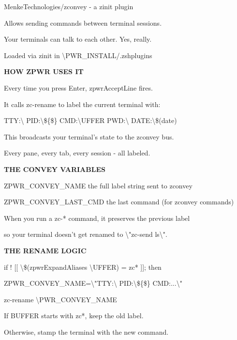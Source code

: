 \documentclass[11pt,a4paper,twoside]{book}
\begin{document}
MenkeTechnologies/zconvey - a zinit plugin

Allows sending commands between terminal sessions.

Your terminals can talk to each other. Yes, really.

Loaded via zinit in \textbackslash{}PWR\_INSTALL/.zshplugins


\vspace{12pt}
{\bfseries\color{neonyellow} HOW ZPWR USES IT}\vspace{4pt}

Every time you press Enter, zpwrAcceptLine fires.

It calls zc-rename to label the current terminal with:

TTY:\textbackslash{} PID:\textbackslash{}\$\{\$\} CMD:\textbackslash{}UFFER PWD:\textbackslash{} DATE:\textbackslash{}\$(date)

This broadcasts your terminal's state to the zconvey bus.

Every pane, every tab, every session - all labeled.


\vspace{12pt}
{\bfseries\color{neonyellow} THE CONVEY VARIABLES}\vspace{4pt}

ZPWR\_CONVEY\_NAME      the full label string sent to zconvey

ZPWR\_CONVEY\_LAST\_CMD  the last command (for zconvey commands)

When you run a zc-* command, it preserves the previous label

so your terminal doesn't get renamed to \textbackslash{}"zc-send ls\textbackslash{}".


\vspace{12pt}
{\bfseries\color{neonyellow} THE RENAME LOGIC}\vspace{4pt}

\begin{codebox}
if ! [[ \textbackslash{}\$(zpwrExpandAliases \textbackslash{}UFFER) = zc* ]]; then\\
\end{codebox}

ZPWR\_CONVEY\_NAME=\textbackslash{}"TTY:\textbackslash{} PID:\textbackslash{}\$\{\$\} CMD:...\textbackslash{}"

zc-rename \textbackslash{}PWR\_CONVEY\_NAME

If BUFFER starts with zc*, keep the old label.

Otherwise, stamp the terminal with the new command.
\end{document}
